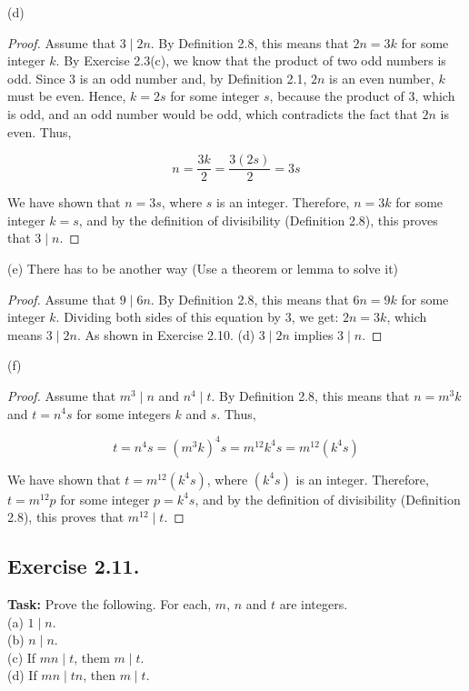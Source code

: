 \documentclass{article}
\begin{document}
\noindent (d) 

\begin{proof}
    Assume that \( 3 \mid 2n \). By Definition 2.8, this means that \( 2n = 3k \) for some integer \( k \). By Exercise 2.3(c), we know that the product of two odd numbers is odd. Since 3 is an odd number and, by Definition 2.1, \( 2n \) is an even number, \( k \) must be even. Hence, \( k = 2s \) for some integer \( s \), because the product of 3, which is odd, and an odd number would be odd, which contradicts the fact that \( 2n \) is even. Thus,
    
    \[
    n = \frac{3k}{2} = \frac{3(2s)}{2} = 3s
    \]
    
    We have shown that \( n = 3s \), where \( s \) is an integer. Therefore, \( n = 3k \) for some integer \( k = s \), and by the definition of divisibility (Definition 2.8), this proves that \( 3 \mid n \).
\end{proof}

\noindent (e) There has to be another way (Use a theorem or lemma to solve it)

\begin{proof}
     Assume that \( 9 \mid 6n \). By Definition 2.8, this means that \( 6n = 9k \) for some integer \( k \). Dividing both sides of this equation by 3, we get: $2n=3k$, which means $3 \mid 2n$. As shown in Exercise 2.10. (d) $3 \mid 2n$ implies $3 \mid n$.
\end{proof}

\noindent (f)

\begin{proof}
    Assume that  $m^3 \mid n$ and $n^4 \mid t$. By Definition 2.8, this means that $n=m^3k$ and $t=n^4s$ for some integers $k$ and $s$.
    Thus,

    \[t=n^4s=(m^3k)^4s=m^{12}k^4s=m^{12}(k^4s)\]

    We have shown that \( t = m^{12}(k^4s)\), where \( (k^4s) \) is an integer. Therefore, \( t = m^{12}p \) for some integer \( p = k^4s \), and by the definition of divisibility (Definition 2.8), this proves that \( m^{12} \mid t \).
\end{proof}

\newpage

\subsection{Exercise 2.11.}
\textbf{Task:} Prove the following. For each, $m$, $n$ and $t$ are integers.\\
(a) $1 \mid n$.\\
(b) $n \mid n$.\\
(c) If $mn \mid t$, them $m \mid t$.\\
(d) If $mn \mid tn$, then $m \mid t$.
\end{document}
